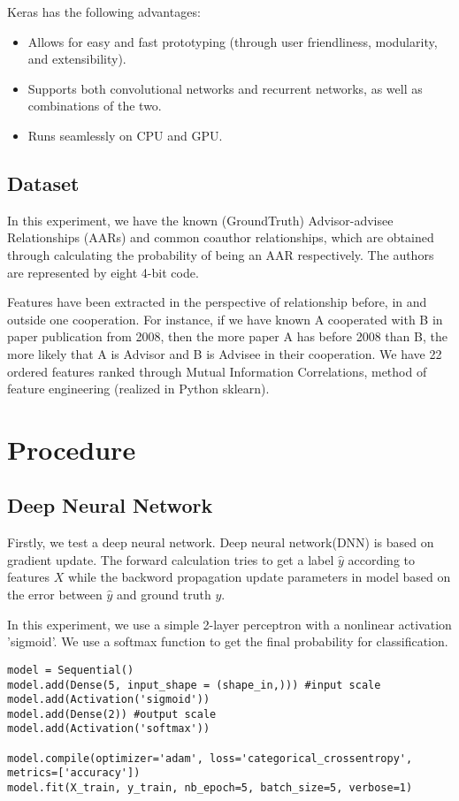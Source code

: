 \documentclass[12pt]{report}
\begin{document}
Keras has the following advantages:

\begin{spacing}{0.2}
\begin{itemize}
	\item Allows for easy and fast prototyping (through user friendliness, modularity, and extensibility).
	\item Supports both convolutional networks and recurrent networks, as well as combinations of the two.
	\item Runs seamlessly on CPU and GPU.
\end{itemize}
\end{spacing}

\subsection{Dataset}
In this experiment, we have the known (GroundTruth) Advisor-advisee Relationships (AARs) and common coauthor relationships, which are obtained through calculating the probability of being an AAR respectively. The authors are represented by eight 4-bit code.

Features have been extracted in the perspective of relationship before, in and outside one cooperation. For instance, if we have known A cooperated with B in paper publication from 2008, then the more paper A has before 2008 than B, the more likely that A is Advisor and B is Advisee in their cooperation. We have 22 ordered features ranked through Mutual Information Correlations, method of feature engineering (realized in Python sklearn).
\section{Procedure}
\subsection{Deep Neural Network}
Firstly, we test a deep neural network. Deep neural network(DNN) is based on gradient update. The forward calculation tries to get a label $\hat{y}$ according to features $X$ while the backword propagation update parameters in model based on the error between $\hat{y}$ and ground truth $y$.

In this experiment, we use a simple 2-layer perceptron with a nonlinear activation 'sigmoid'. We use a softmax function to get the final probability for classification.

\begin{lstlisting}
model = Sequential()
model.add(Dense(5, input_shape = (shape_in,))) #input scale 
model.add(Activation('sigmoid'))
model.add(Dense(2)) #output scale
model.add(Activation('softmax'))

model.compile(optimizer='adam', loss='categorical_crossentropy', metrics=['accuracy'])
model.fit(X_train, y_train, nb_epoch=5, batch_size=5, verbose=1)
\end{lstlisting}
\end{document}
